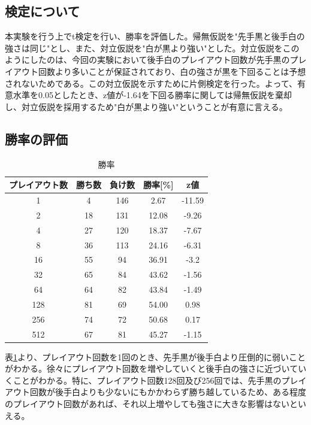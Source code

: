 \documentclass[10pt, a4paper]{jsarticle}
\begin{document}
\subsection{検定について}
本実験を行う上でt検定を行い、勝率を評価した。帰無仮説を"先手黒と後手白の強さは同じ"とし、また、対立仮説を"白が黒より強い"とした。対立仮説をこのようにしたのは、今回の実験において後手白のプレイアウト回数が先手黒のプレイアウト回数より多いことが保証されており、白の強さが黒を下回ることは予想されないためである。この対立仮説を示すために片側検定を行った。よって、有意水準を0.05としたとき、z値が-1.64を下回る勝率に関しては帰無仮説を棄却し、対立仮説を採用するため"白が黒より強い"ということが有意に言える。
\subsection{勝率の評価}
\begin{table}[ht]
    \begin{center}
        \begin{tabular}{c|c|c|c|c}
            プレイアウト数 & 勝ち数 & 負け数 & 勝率[\%] & z値 \\ \hline
            1 & 4 & 146 & 2.67 & -11.59 \\
            2 & 18 & 131 & 12.08 & -9.26 \\
            4 & 27 & 120 & 18.37 & -7.67 \\
            8 & 36 & 113 & 24.16 & -6.31 \\
            16 & 55 & 94 & 36.91 & -3.2 \\
            32 & 65 & 84 & 43.62 & -1.56 \\
            64 & 64 & 82 & 43.84 & -1.49 \\
            128 & 81 & 69 & 54.00 & 0.98 \\
            256 & 74 & 72 & 50.68 & 0.17 \\
            512 & 67 & 81 & 45.27 & -1.15
        \end{tabular}
        \caption{勝率}
        \label{tab:win_rate}
    \end{center}
\end{table}
\par 表\ref{tab:win_rate}より、プレイアウト回数を1回のとき、先手黒が後手白より圧倒的に弱いことがわかる。徐々にプレイアウト回数を増やしていくと後手白の強さに近づいていくことがわかる。特に、プレイアウト回数128回及び256回では、先手黒のプレイアウト回数が後手白よりも少ないにもかかわらず勝ち越しているため、ある程度のプレイアウト回数があれば、それ以上増やしても強さに大きな影響はないといえる。
\end{document}
